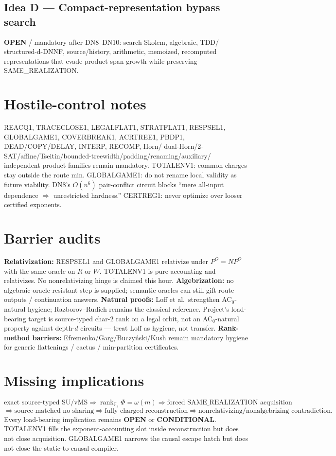 \documentclass[11pt]{article}
\begin{document}
\subsection*{Idea D --- Compact-representation bypass search}
\textbf{OPEN} / mandatory after DN8--DN10: search Skolem, algebraic, TDD/
structured-d-DNNF, source/history, arithmetic, memoized, recomputed
representations that evade product-span growth while preserving
SAME\_REALIZATION.

\section*{Hostile-control notes}
REACQ1, TRACECLOSE1, LEGALFLAT1, STRATFLAT1, RESPSEL1, GLOBALGAME1,
COVERBREAK1, ACRTREE1, PBDP1, DEAD/COPY/DELAY, INTERP, RECOMP, Horn/
dual-Horn/2-SAT/affine/Tseitin/bounded-treewidth/padding/renaming/auxiliary/
independent-product families remain mandatory. TOTALENV1: common charges stay
outside the route min. GLOBALGAME1: do not rename local validity as future
viability. DN8's $O(n^6)$ pair-conflict circuit blocks ``mere all-input
dependence $\Rightarrow$ unrestricted hardness.'' CERTREG1: never optimize over
looser certified exponents.

\section*{Barrier audits}
\textbf{Relativization:} RESPSEL1 and GLOBALGAME1 relativize under
$P^O=NP^O$ with the same oracle on $R$ or $W$. TOTALENV1 is pure accounting and
relativizes. No nonrelativizing hinge is claimed this hour.
\textbf{Algebrization:} no algebraic-oracle-resistant step is supplied;
semantic oracles can still gift route outputs / continuation answers.
\textbf{Natural proofs:} Loff et al.\ strengthen AC$_0$-natural hygiene;
Razborov--Rudich remains the classical reference. Project's load-bearing
target is source-typed char-$2$ rank on a legal orbit, not an AC$_0$-natural
property against depth-$d$ circuits --- treat Loff as hygiene, not transfer.
\textbf{Rank-method barriers:} Efremenko/Garg/Buczy\'nski/Kush remain mandatory
hygiene for generic flattenings / cactus / min-partition certificates.

\section*{Missing implications}
\[
\text{exact source-typed SU/vMS}
\Longrightarrow
\operatorname{rank}_{\mathbb F_2}\Phi=\omega(m)
\Longrightarrow
\text{forced SAME\_REALIZATION acquisition}
\]
\[
\Longrightarrow
\text{source-matched no-sharing}
\Longrightarrow
\text{fully charged reconstruction}
\Longrightarrow
\text{nonrelativizing/nonalgebrizing contradiction}.
\]
Every load-bearing implication remains \textbf{OPEN} or \textbf{CONDITIONAL}.
TOTALENV1 fills the exponent-accounting slot inside reconstruction but does not
close acquisition. GLOBALGAME1 narrows the causal escape hatch but does not
close the static-to-causal compiler.
\end{document}
